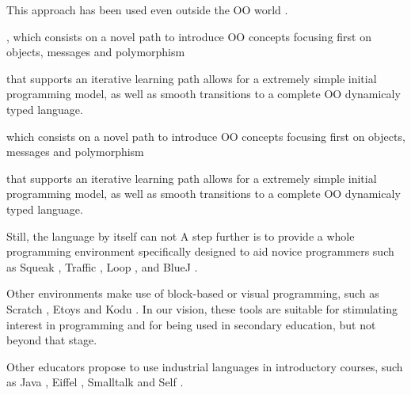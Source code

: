 This approach has been used even outside the OO world \cite{feurzeig_programming-languages_1970, pattis_karel_1981, lopez_nombre_2012}.

\cite{passerini2017wollok}, 
which consists on a novel path to introduce OO concepts focusing first on objects, messages and polymorphism 

that supports an iterative learning path allows for a extremely simple initial programming model, 
as well as smooth transitions to a complete OO dynamicaly typed language.

which consists on a novel path to introduce OO concepts focusing first on objects, messages and polymorphism 

that supports an iterative learning path allows for a extremely simple initial programming model, 
as well as smooth transitions to a complete OO dynamicaly typed language.

Still, the language by itself can not
A step further is to provide a whole programming environment specifically designed to aid novice programmers 
such as Squeak \cite{ingalls_back_1997}, 
Traffic \cite{broy_outside-method_2003},
Loop \cite{griggio_programming_2011}, 
and BlueJ \cite{bennedsen_bluej_2010}.

Other environments make use of block-based or visual programming, 
such as Scratch \cite{malan_scratch_2007}, Etoys \cite{lee_empowering_2011} and Kodu \cite{kodu}. 
In our vision, these tools are suitable for stimulating interest in programming and for being used in secondary education, but not beyond that stage.

Other educators propose to use industrial languages in introductory courses, 
such as Java \cite{kolling2001guidelines}, Eiffel \cite{meyer1993towards}, Smalltalk \cite{ducasse2006squeak} and Self \cite{Unga87a}.


